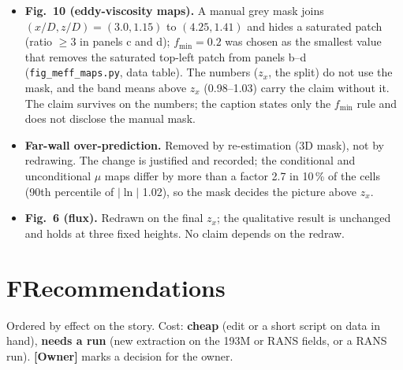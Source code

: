 \documentclass[10pt]{article}
\begin{document}
\begin{itemize}
\item \textbf{Fig.~10 (eddy-viscosity maps).} A manual grey mask joins $(x/D,z/D)=(3.0,1.15)$ to $(4.25,1.41)$ and
  hides a saturated patch (ratio $\ge3$ in panels c and d); $f_{\min}=0.2$ was chosen as the smallest value that
  removes the saturated top-left patch from panels b--d (\texttt{fig\_meff\_maps.py}, data table). The numbers
  ($z_x$, the split) do not use the mask, and the band means above $z_x$ (0.98--1.03) carry the claim without it.
  The claim survives on the numbers; the caption states only the $f_{\min}$ rule and does not disclose the manual
  mask.
\item \textbf{Far-wall over-prediction.} Removed by re-estimation (3D mask), not by redrawing. The change is
  justified and recorded; the conditional and unconditional $\mu$ maps differ by more than a factor 2.7 in 10\,\%
  of the cells (90th percentile of $|\ln|$ 1.02), so the mask decides the picture above $z_x$.
\item \textbf{Fig.~6 (flux).} Redrawn on the final $z_x$; the qualitative result is unchanged and holds at three
  fixed heights. No claim depends on the redraw.
\end{itemize}

\newpage
\section*{F\quad Recommendations}

Ordered by effect on the story. Cost: \textbf{cheap} (edit or a short script on data in hand), \textbf{needs a
run} (new extraction on the 193M or RANS fields, or a RANS run). \textbf{[Owner]} marks a decision for the owner.
\end{document}
